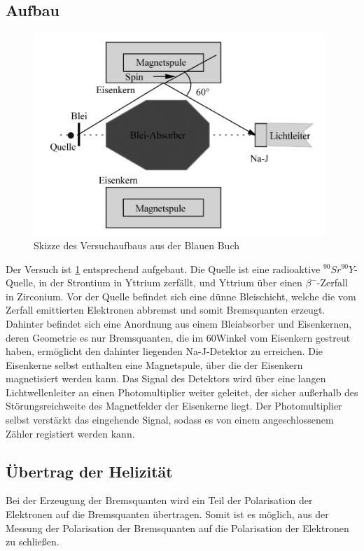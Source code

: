 \subsection{Aufbau}
\begin{figure}[H]
    \centering
    \includegraphics[width=110mm,scale=0.5]{Paritaetsverletzung/include/ParitaetsverletzungAufbau.png}
    \caption{Skizze des Versuchaufbaus aus der Blauen Buch \cite{BlueBook}} 
    \label{fig:Versuchsaufbau}
\end{figure}
Der Versuch ist \ref{fig:Versuchsaufbau} entsprechend aufgebaut. Die Quelle ist eine radioaktive $^{90}Sr^{90}Y$-Quelle, in der Strontium in Yttrium zerfällt, und Yttrium über einen $\beta^-$-Zerfall in Zirconium. Vor der Quelle befindet sich eine dünne Bleischicht, welche die vom Zerfall emittierten Elektronen abbremst und somit Bremsquanten erzeugt. Dahinter befindet sich eine Anordnung aus einem Bleiabsorber und Eisenkernen, deren Geometrie es nur Bremsquanten, die im 60\degree Winkel vom Eisenkern gestreut haben, ermöglicht den dahinter liegenden Na-J-Detektor zu erreichen. Die Eisenkerne selbst enthalten eine Magnetspule, über die der Eisenkern magnetisiert werden kann. Das Signal des Detektors wird über eine langen Lichtwellenleiter an einen Photomultiplier weiter geleitet, der sicher außerhalb des Störungsreichweite des Magnetfelder der Eisenkerne liegt. Der Photomultiplier selbst verstärkt das eingehende Signal, sodass es von einem angeschlossenem Zähler registiert werden kann. 
\subsection{Übertrag der Helizität}
Bei der Erzeugung der Bremsquanten wird ein Teil der Polarisation der Elektronen auf die Bremsquanten übertragen. Somit ist es möglich, aus der Messung der Polarisation der Bremsquanten auf die Polarisation der Elektronen zu schließen. 


